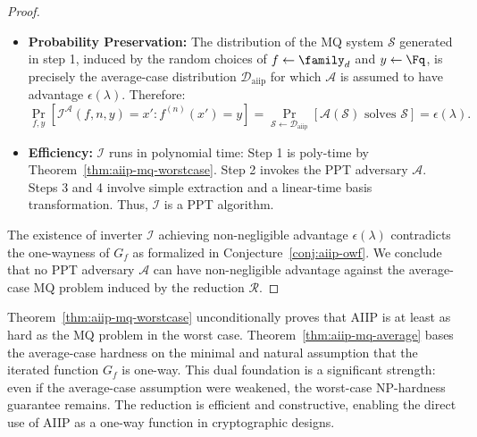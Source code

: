 \begin{proof}
\begin{itemize}
                    \item \textbf{Probability Preservation:} The distribution of the MQ system $\mathcal{S}$ generated in step 1, induced by the random choices of $f \leftarrow \family_d$ and $y \leftarrow \Fq$, is precisely the average-case distribution $\mathcal{D}_{\text{aiip}}$ for which $\mathcal{A}$ is assumed to have advantage $\epsilon(\lambda)$. Therefore:
                    \begin{equation}
                        \Pr_{f,y}[\mathcal{I}^{\mathcal{A}}(f, n, y) = x' : f^{(n)}(x') = y] = \Pr_{\mathcal{S} \gets \mathcal{D}_{\text{aiip}}}[\mathcal{A}(\mathcal{S}) \text{ solves } \mathcal{S}] = \epsilon(\lambda).
                    \end{equation}
                    \item \textbf{Efficiency:} $\mathcal{I}$ runs in polynomial time: Step 1 is poly-time by Theorem~\ref{thm:aiip-mq-worstcase}. Step 2 invokes the PPT adversary $\mathcal{A}$. Steps 3 and 4 involve simple extraction and a linear-time basis transformation. Thus, $\mathcal{I}$ is a PPT algorithm.
                \end{itemize}
                The existence of inverter $\mathcal{I}$ achieving non-negligible advantage $\epsilon(\lambda)$ contradicts the one-wayness of $G_f$ as formalized in Conjecture~\ref{conj:aiip-owf}. We conclude that no PPT adversary $\mathcal{A}$ can have non-negligible advantage against the average-case MQ problem induced by the reduction $\mathcal{R}$.
            \end{proof}
            \begin{remark}\label{rm:reduction-interpretation}
                Theorem~\ref{thm:aiip-mq-worstcase} unconditionally proves that AIIP is at least as hard as the MQ problem in the worst case. Theorem~\ref{thm:aiip-mq-average} bases the average-case hardness on the minimal and natural assumption that the iterated function $G_f$ is one-way. This dual foundation is a significant strength: even if the average-case assumption were weakened, the worst-case NP-hardness guarantee remains. The reduction is efficient and constructive, enabling the direct use of AIIP as a one-way function in cryptographic designs.
            \end{remark}
        

